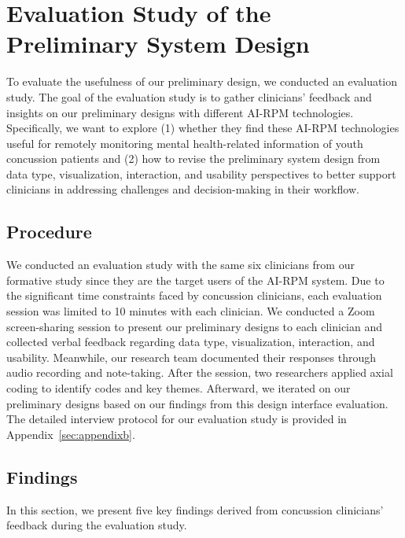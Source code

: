 
\section{Evaluation Study of the Preliminary System Design}

To evaluate the usefulness of our preliminary design, we conducted an evaluation study.
The goal of the evaluation study is to gather clinicians' feedback and insights on our preliminary designs with different AI-RPM technologies. Specifically, we want to explore (1) whether they find these AI-RPM technologies useful for remotely monitoring mental health-related information of youth concussion patients and (2) how to revise the preliminary system design from data type, visualization, interaction, and usability perspectives to better support clinicians in addressing challenges and decision-making in their workflow.

\subsection{Procedure}
We conducted an evaluation study with the same six clinicians from our formative study since they are the target users of the AI-RPM system. 
Due to the significant time constraints faced by concussion clinicians, each evaluation session was limited to 10 minutes with each clinician. We conducted a Zoom screen-sharing session to present our preliminary designs to each clinician and collected verbal feedback regarding data type, visualization, interaction, and usability. Meanwhile, our research team documented their responses through audio recording and note-taking. After the session, two researchers applied axial coding to identify codes and key themes. Afterward, we iterated on our preliminary designs based on our findings from this design interface evaluation. The detailed interview protocol for our evaluation study is provided in Appendix~\ref{sec:appendixb}.

\subsection{Findings} 
In this section, we present five key findings derived from concussion clinicians' feedback during the evaluation study.

